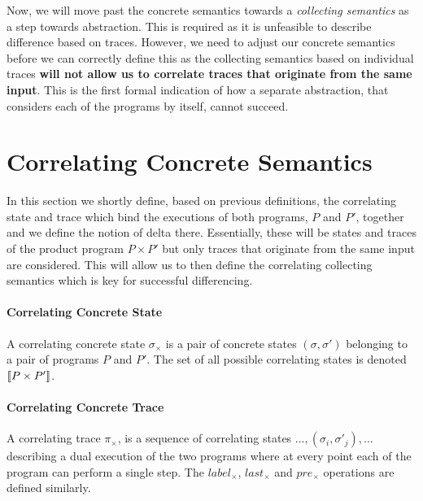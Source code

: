 Now, we will move past the concrete semantics towards a \emph{collecting semantics} as a step towards abstraction. This is required as it is unfeasible to describe difference based on traces. However, we need to adjust our concrete semantics before we can correctly define this as the collecting semantics based on individual traces \textbf{will not allow us to correlate traces that originate from the same input}. This is the first formal indication of how a separate abstraction, that considers each of the programs by itself, cannot succeed.

\section{Correlating Concrete Semantics}

In this section we shortly define, based on previous definitions, the correlating state and trace which bind the executions of both programs, $P$ and $P'$, together and we define the notion of delta there. Essentially, these will be states and traces of the product program $P \times P'$ but only traces that originate from the same input are considered. This will allow us to then define the correlating collecting semantics which is key for successful differencing.

\paragraph{Correlating Concrete State} 
A correlating concrete state $\sigma_{\times}$ is a pair of concrete states $(\sigma,\sigma')$ belonging to a pair of programs $P$ and $P'$. The set of all possible correlating states is denoted $\lbrack\!\lbrack P \times P' \rbrack\!\rbrack$.

\paragraph{Correlating Concrete Trace} 
A correlating trace $\pi_{\times}$, is a sequence of correlating states $...,(\sigma_i,\sigma'_j),...$ describing a dual execution of the two programs where at every point each of the program can perform a single step. The $label_{\times}$, $last_{\times}$ and $pre_{\times}$ operations are defined similarly.

